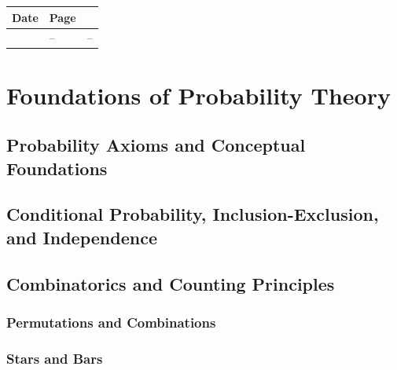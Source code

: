 \documentclass[12pt]{book}
\begin{document}
\vspace{2.5cm}

\noindent

\vspace{.5cm}
\begin{longtable}{p{4cm}p{1.45cm}p{8cm}}
	\toprule
	Date & Page & \\
	\midrule
	\Date{} & --  & --\\
	\bottomrule
\end{longtable}




\chapter{Foundations of Probability Theory}

\section{Probability Axioms and Conceptual Foundations}

\section{Conditional Probability, Inclusion-Exclusion, and Independence}

\section{Combinatorics and Counting Principles}

\subsection{Permutations and Combinations}

\subsection{Stars and Bars}
\end{document}
